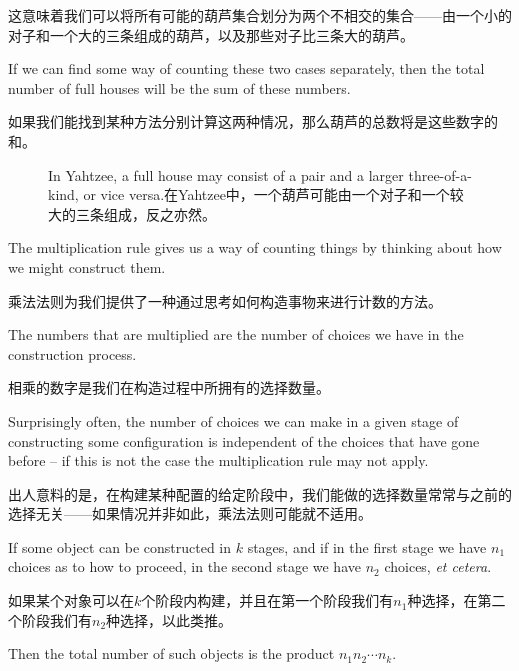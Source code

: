 这意味着我们可以将所有可能的葫芦集合划分为两个不相交的集合——由一个小的对子和一个大的三条组成的葫芦，以及那些对子比三条大的葫芦。

If we can find some way of counting these
two cases separately, then the total number of full houses will be the 
sum of these numbers.

如果我们能找到某种方法分别计算这两种情况，那么葫芦的总数将是这些数字的和。

\begin{figure}[!hbtp]
\begin{center}


\vspace{.3in}


\end{center}
\caption[Full houses in Yahtzee. Yahtzee中的葫芦。]{In Yahtzee, a full house may consist of 
a pair and a larger three-of-a-kind, or vice versa.在Yahtzee中，一个葫芦可能由一个对子和一个较大的三条组成，反之亦然。}
\label{fig:full_house} 
\end{figure}


The multiplication rule gives 
us a way of counting things by thinking
about how we might construct them.

乘法法则为我们提供了一种通过思考如何构造事物来进行计数的方法。

The numbers that are multiplied
are the number of choices we have in the construction process.

相乘的数字是我们在构造过程中所拥有的选择数量。

Surprisingly often, the number of choices we can make in a given 
stage of constructing some configuration is independent of the choices
that have gone before -- if this is not the case the multiplication rule
may not apply.

出人意料的是，在构建某种配置的给定阶段中，我们能做的选择数量常常与之前的选择无关——如果情况并非如此，乘法法则可能就不适用。

If some object can be constructed in $k$ stages, and if in the first
stage we have $n_1$ choices as to how to proceed, in the second stage
we have $n_2$ choices, \emph{et cetera}.

如果某个对象可以在$k$个阶段内构建，并且在第一个阶段我们有$n_1$种选择，在第二个阶段我们有$n_2$种选择，以此类推。

Then the total number of such
objects is the product $n_1n_2 \cdots n_k$.

